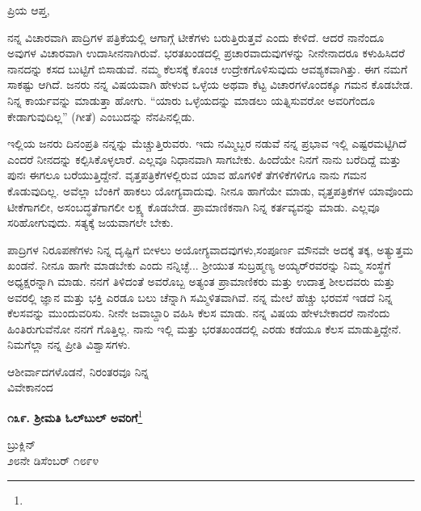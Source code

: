 \noindent
ಪ್ರಿಯ ಆಪ್ತ,

ನನ್ನ ವಿಚಾರವಾಗಿ ಪಾದ್ರಿಗಳ ಪತ್ರಿಕೆಯಲ್ಲಿ ಆಗಾಗ್ಗೆ ಟೀಕೆಗಳು ಬರುತ್ತಿರುತ್ತವೆ ಎಂದು ಕೇಳಿದೆ. ಆದರೆ ನಾನೆಂದೂ ಅವುಗಳ ವಿಚಾರವಾಗಿ ಉದಾಸೀನನಾಗಿರುವೆ. ಭರತಖಂಡ\break ದಲ್ಲಿ ಪ್ರಚಾರವಾದುವುಗಳನ್ನು ನೀನೇನಾದರೂ ಕಳುಹಿಸಿದರೆ ನಾನದನ್ನು ಕಸದ ಬುಟ್ಟಿಗೆ ಬಿಸಾಡುವೆ. ನಮ್ಮ ಕೆಲಸಕ್ಕೆ ಕೊಂಚ ಉದ್ರೇಕಗೊಳಿಸುವುದು ಆವಶ್ಯಕವಾಗಿತ್ತು. ಈಗ ನಮಗೆ ಸಾಕಷ್ಟು ಆಗಿದೆ. ಜನರು ನನ್ನ ವಿಷಯವಾಗಿ ಹೇಳುವ ಒಳ್ಳೆಯ ಅಥವಾ ಕೆಟ್ಟ ವಿಚಾರಗಳೊಂದಕ್ಕೂ ಗಮನ ಕೊಡಬೇಡ. ನಿನ್ನ ಕಾರ್ಯವನ್ನು ಮಾಡುತ್ತಾ ಹೋಗು. “ಯಾರು ಒಳ್ಳೆಯದನ್ನು ಮಾಡಲು ಯತ್ನಿಸುವರೋ ಅವರಿಗೆಂದೂ ಕೇಡಾಗುವುದಿಲ್ಲ” (ಗೀತೆ) ಎಂಬುದನ್ನು ನೆನಪಿನಲ್ಲಿಡು.

ಇಲ್ಲಿಯ ಜನರು ದಿನಂಪ್ರತಿ ನನ್ನನ್ನು ಮೆಚ್ಚುತ್ತಿರುವರು. ಇದು ನಮ್ಮಿಬ್ಬರ ನಡುವೆ\enginline{-} ನನ್ನ ಪ್ರಭಾವ ಇಲ್ಲಿ ಎಷ್ಟರಮಟ್ಟಿಗಿದೆ ಎಂದರೆ ನೀನದನ್ನು ಕಲ್ಪಿಸಿಕೊಳ್ಳಲಾರೆ. ಎಲ್ಲವೂ ನಿಧಾನವಾಗಿ ಸಾಗಬೇಕು. ಹಿಂದೆಯೇ ನಿನಗೆ ನಾನು ಬರೆದಿದ್ದೆ ಮತ್ತು ಪುನಃ ಈಗಲೂ ಬರೆಯುತ್ತಿದ್ದೇನೆ. ವೃತ್ತಪತ್ರಿಕೆಗಳಲ್ಲಿರುವ ಯಾವ ಹೊಗಳಿಕೆ ತೆಗಳಿಕೆಗಳಿಗೂ ನಾನು ಗಮನ ಕೊಡುವುದಿಲ್ಲ. ಅವೆಲ್ಲಾ ಬೆಂಕಿಗೆ ಹಾಕಲು ಯೋಗ್ಯವಾದುವು. ನೀನೂ ಹಾಗೆಯೇ ಮಾಡು, ವೃತ್ತಪತ್ರಿಕೆಗಳ ಯಾವೊಂದು ಟೀಕೆಗಾಗಲೀ, ಅಸಂಬದ್ಧತೆಗಾಗಲೀ ಲಕ್ಷ್ಯ ಕೊಡಬೇಡ. ಪ್ರಾಮಾಣಿಕನಾಗಿ ನಿನ್ನ ಕರ್ತವ್ಯವನ್ನು ಮಾಡು. ಎಲ್ಲವೂ ಸರಿಹೋಗುವುದು. ಸತ್ಯಕ್ಕೆ ಜಯವಾಗಲೇ ಬೇಕು.

ಪಾದ್ರಿಗಳ ನಿರೂಪಣೆಗಳು ನಿನ್ನ ದೃಷ್ಟಿಗೆ ಬೀಳಲು ಅಯೋಗ್ಯವಾದವುಗಳು,\break ಸಂಪೂರ್ಣ ಮೌನವೇ ಅದಕ್ಕೆ ತಕ್ಕ, ಅತ್ಯುತ್ತಮ ಖಂಡನೆ. ನೀನೂ ಹಾಗೇ ಮಾಡಬೇಕು ಎಂದು ನನ್ನಿಚ್ಛೆ... ಶ‍್ರೀಯುತ ಸುಬ್ರಹ್ಮಣ್ಯ ಅಯ್ಯರ್‌ರವರನ್ನು ನಿಮ್ಮ ಸಂಸ್ಥೆಗೆ ಅಧ್ಯಕ್ಷರನ್ನಾಗಿ ಮಾಡು. ನನಗೆ ತಿಳಿದಂತೆ ಅವರೊಬ್ಬ ಅತ್ಯಂತ ಪ್ರಾಮಾಣಿಕರು ಮತ್ತು ಉದಾತ್ತ ಶೀಲದವರು ಮತ್ತು ಅವರಲ್ಲಿ ಜ್ಞಾನ ಮತ್ತು ಭಕ್ತಿ ಎರಡೂ ಬಲು ಚೆನ್ನಾಗಿ ಸಮ್ಮಿಳಿತವಾಗಿವೆ. ನನ್ನ ಮೇಲೆ ಹೆಚ್ಚು ಭರವಸೆ ಇಡದೆ ನಿನ್ನ ಕೆಲಸವನ್ನು ಮುಂದುವರಿಸು. ನೀನೇ ಜವಾಬ್ದಾರಿ ವಹಿಸಿ ಕೆಲಸ ಮಾಡು. ನನ್ನ ವಿಷಯ ಹೇಳಬೇಕಾದರೆ ನಾನೆಂದು ಹಿಂತಿರುಗುವೆನೋ ನನಗೆ ಗೊತ್ತಿಲ್ಲ. ನಾನು ಇಲ್ಲಿ ಮತ್ತು ಭರತಖಂಡದಲ್ಲಿ ಎರಡು ಕಡೆಯೂ ಕೆಲಸ ಮಾಡುತ್ತಿದ್ದೇನೆ. ನಿಮಗೆಲ್ಲಾ ನನ್ನ ಪ್ರೀತಿ ವಿಶ್ವಾಸಗಳು.

\vspace{-0.5cm}

{\flushright
ಆಶೀರ್ವಾದಗಳೊಡನೆ, ನಿರಂತರವೂ ನಿನ್ನ\\ವಿವೇಕಾನಂದ\par}

\begin{center}
\textbf{೧೩೯. ಶ‍್ರೀಮತಿ ಓಲ್‌ಬುಲ್‌ ಅವರಿಗೆ}\footnote{}
\end{center}

\vspace{-0.7cm}

\begin{flushright}
ಬ್ರುಕ್ಲಿನ್\\೨೮ನೇ ಡಿಸೆಂಬರ್ ೧೮೯೪
\end{flushright}

\vspace{-0.5cm}

